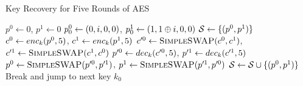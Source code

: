 \documentclass[twoside]{article}
\begin{document}
\begin{algorithm}
    \caption{Key Recovery for Five Rounds of AES}
    \label{alg:aes-5-rounds-key}
    \begin{algorithmic}[1]
            \State \(p^0 \gets 0\), \(p^1 \gets 0\)
            \State \(p_0^0 \gets (0, i, 0, 0)\), \(p_0^1 \gets (1, 1 
            \oplus i, 0, 0)\)
            \State \(\mathcal S \gets \{(p^0, p^1)\}\)
                \State \(c^0 \gets enc_k(p^0, 5)\), \(c^1 \gets 
                enc_k(p^1, 5)\)
                \State \(c^{\prime 0} \gets \textsc{SimpleSWAP}(c^0,
                c^1)\), \(c^{\prime 1} \gets \textsc{SimpleSWAP}(c^1,
                c^0)\)
                \State \(p^{\prime 0} \gets dec_k(c^{\prime 0}, 5)\),
                \(p^{\prime 1} \gets dec_k(c^{\prime 1}, 5)\)
                \State \(p^0 \gets \textsc{SimpleSWAP}(p^{\prime 0},
                p^{\prime 1})\), \(p^1 \gets \textsc{SimpleSWAP}(p^{\prime
                1}, p^{\prime 0})\)
                \State \(\mathcal S \gets \mathcal S \cup \{(p^0, p^1)\}\)
            \EndWhile
                        \State Break and jump to next key
                    \EndIf
                \EndFor
                \State \Return \(k_0\)
            \EndFor
        \EndFor
    \end{algorithmic}
\end{algorithm}
\end{document}
